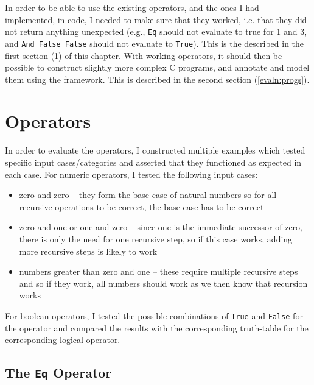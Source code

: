 In order to be able to use the existing operators, and the ones I had implemented, in code, I needed to make sure that they worked, i.e. that they did not return anything unexpected (e.g., \texttt{Eq} should not evaluate to true for 1 and 3, and \texttt{And False False} should not evaluate to \texttt{True}). This is the described in the first section (\ref{evaln:ops}) of this chapter. With working operators, it should then be possible to construct slightly more complex C programs, and annotate and model them using the framework. This is described in the second section (\ref{evaln:progs}).


\section{Operators}\label{evaln:ops}
    In order to evaluate the operators, I constructed multiple examples which tested specific input cases/categories and asserted that they functioned as expected in each case. For numeric operators, I tested the following input cases:
    \begin{itemize}
        \item zero and zero -- they form the base case of natural numbers so for
              all recursive operations to be correct, the base case has to be correct
        \item zero and one or one and zero -- since one is the immediate
              successor of zero, there is only the need for one recursive step,
              so if this case works, adding more recursive steps is likely to 
              work
        \item numbers greater than zero and one -- these require multiple 
              recursive steps and so if they work, all numbers should work as
              we then know that recursion works
    \end{itemize}
    
    For boolean operators, I tested the possible combinations of \texttt{True} and \texttt{False} for the operator and compared the results with the corresponding truth-table for the corresponding logical operator.
	
    \subsection{The \texttt{Eq} Operator}\label{evaln:ops:eq}
        
        

